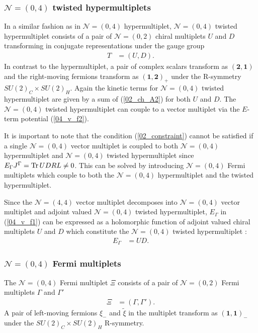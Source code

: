 \documentclass{article}
\DeclareMathOperator*{\Tr}{{\rm Tr}}
\numberwithin{equation}{section}
\begin{document}
\subsubsection{$\mathcal{N}=(0,4)$ twisted hypermultiplets}
\label{sec_04thm}
In a similar fashion as in $\mathcal{N}=(0,4)$ hypermultiplet, 
$\mathcal{N}=(0,4)$ twisted hypermultiplet consists of a pair of 
$\mathcal{N}=(0,2)$ chiral multiplets $U$ and $D$ transforming 
in conjugate representations under the gauge group
\begin{align}
\label{04_hm}
T&=(U,D). 
\end{align}
In contrast to the hypermultiplet, 
a pair of complex scalars transform as $(\bm{2},\bm{1})$ 
and the right-moving fermions transform as $(\bm{1},\bm{2})_{+}$ under the R-symmetry $SU(2)_{C}\times SU(2)_{H}$. 
Again the kinetic terms for $\mathcal{N}=(0,4)$ twisted hypermultiplet are given by a sum of 
(\ref{02_ch_A2}) for both $U$ and $D$. 
The $\mathcal{N}=(0,4)$ twisted hypermultiplet can couple to a vector multiplet via the $E$-term potential 
(\ref{04_v_f2}).  


It is important to note that 
the condition (\ref{02_constraint}) cannot be satisfied 
if a single $\mathcal{N}=(0,4)$ vector multiplet is coupled to 
both $\mathcal{N}=(0,4)$ hypermultiplet and $\mathcal{N}=(0,4)$ twisted hypermultiplet 
since $E_{\Gamma}J^{\Gamma}=\Tr UDRL\neq 0$. 
This can be solved by introducing $\mathcal{N}=(0,4)$ Fermi multiplets which 
couple to both the $\mathcal{N}=(0,4)$ hypermultiplet and the twisted hypermultiplet. 

Since the $\mathcal{N}=(4,4)$ vector multiplet decomposes into $\mathcal{N}=(0,4)$ vector multiplet 
and adjoint valued $\mathcal{N}=(0,4)$ twisted hypermultiplet, 
$E_{\Gamma}$ in (\ref{04_v_f1}) can be expressed as a holomorphic function of adjoint valued chiral multiplets $U$ and $D$ 
which constitute the $\mathcal{N}=(0,4)$ twisted hypermultiplet \cite{Tong:2014yna}: 
\begin{align}
\label{04_v_f2}
E_{\Gamma}&=UD. 
\end{align}










\subsubsection{$\mathcal{N}=(0,4)$ Fermi multiplets}
\label{sec_04fm}
The $\mathcal{N}=(0,4)$ Fermi multiplet $\Xi$ consists of a pair of $\mathcal{N}=(0,2)$ Fermi multiplets $\Gamma$ and $\Gamma'$
\begin{align}
\label{04_fm}
\Xi&=(\Gamma,\Gamma'). 
\end{align}
A pair of left-moving fermions $\xi_{-}$ and $\tilde{\xi}$ 
in the multiplet transform as $(\bm{1},\bm{1})_{-}$ under the $SU(2)_{C}\times SU(2)_{H}$ R-symmetry. 
\end{document}
